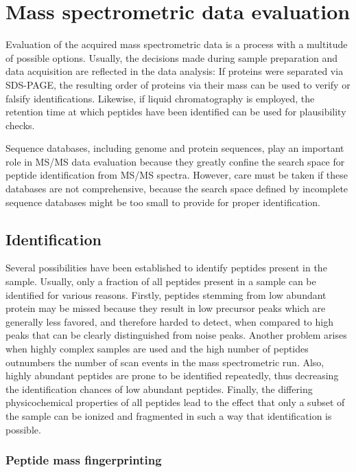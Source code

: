 \section{Mass spectrometric data evaluation}

Evaluation of the acquired mass spectrometric data is a process with a multitude
of possible options.
Usually, the decisions made during sample preparation and data acquisition are
reflected in the data analysis: If proteins were separated via SDS-PAGE, the
resulting order of proteins via their mass can be used to verify or falsify 
identifications.
Likewise, if liquid chromatography is employed, the retention time at which
peptides have been identified can be used for plausibility checks.

Sequence databases, including genome and protein sequences, play an important
role in MS/MS data evaluation because they greatly confine the search space
for peptide identification from MS/MS spectra.
However, care must be taken if these databases are not comprehensive, because
the search space defined by incomplete sequence databases might be too small
to provide for proper identification.


\subsection{Identification}

Several possibilities have been established to identify peptides present
in the sample. 
Usually, only a fraction of all peptides present in a sample can be 
identified for various reasons.
Firstly, peptides stemming from low abundant protein may be missed because 
they result in low precursor peaks which are generally less favored, and
therefore harded to detect, when compared to high peaks that can be clearly
distinguished from noise peaks.
Another problem arises when highly complex samples are used and the
high number of peptides outnumbers the number of scan events in the
mass spectrometric run.
Also, highly abundant peptides are prone to be identified repeatedly,
thus decreasing the identification chances of low abundant peptides.
Finally, the differing physicochemical properties of all peptides
lead to the effect that only a subset of the sample can be ionized and
fragmented in such a way that identification is possible.

\subsubsection{Peptide mass fingerprinting}

